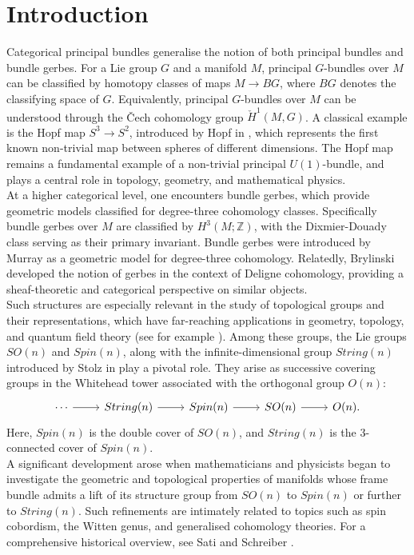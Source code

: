 \documentclass{article}
\theoremstyle{plain}
\theoremstyle{definition}
\begin{document}
\section{Introduction}
Categorical principal bundles generalise the notion of both principal bundles and bundle gerbes. For a Lie group $G$ and a manifold $M$, principal $G$-bundles over $M$ can be classified by homotopy classes of maps $M \longrightarrow BG$, where $BG$ denotes the classifying space of $G$. Equivalently, principal $G$-bundles over $M$ can be understood through the \v{C}ech cohomology group $\check{H}^1(M,G)$. A classical example is the Hopf map $S^3 \longrightarrow S^2$, introduced by Hopf in \cite{MR1512691}, which represents the first known non-trivial map between spheres of different dimensions. The Hopf map remains a fundamental example of a non-trivial principal $U(1)$-bundle, and plays a central role in topology, geometry, and mathematical physics. \\
\indent
At a higher categorical level, one encounters bundle gerbes, which provide geometric models classified for degree-three cohomology classes. Specifically bundle gerbes over $M$ are classified by $H^3(M;\mathbb{Z})$, with the Dixmier-Douady class serving as their primary invariant. Bundle gerbes were introduced by Murray \cite{MR1669206} as a geometric model for degree-three cohomology. Relatedly, Brylinski \cite{MR1197353} developed the notion of gerbes in the context of Deligne cohomology, providing a sheaf-theoretic and categorical perspective on similar objects. \\
\indent
Such structures are especially relevant in the study of topological groups and their representations, which have far-reaching applications in geometry, topology, and quantum field theory (see for example \cite{MR198828}). Among these groups, the Lie groups $SO(n)$ and $Spin(n)$, along with the infinite-dimensional group $String(n)$ introduced by Stolz in \cite{MR1380455} play a pivotal role. They arise as successive covering groups in the Whitehead tower associated with the orthogonal group $O(n)$:
\[
\begin{tikzcd}
\cdots \arrow[r] & String(n) \arrow[r] & Spin(n) \arrow[r] & SO(n) \arrow[r] & O(n).
\end{tikzcd}
\]
Here, $Spin(n)$ is the double cover of $SO(n)$, and $String(n)$ is the $3$-connected cover of $Spin(n)$. \\ 
\indent
A significant development arose when mathematicians and physicists began to investigate the geometric and topological properties of manifolds whose frame bundle admits a lift of its structure group from $SO(n)$ to $Spin(n)$ or further to $String(n)$. Such refinements are intimately related to topics such as spin cobordism, the Witten genus, and generalised cohomology theories. For a comprehensive historical overview, see Sati and Schreiber \cite{MR2588823}.\\
\end{document}

